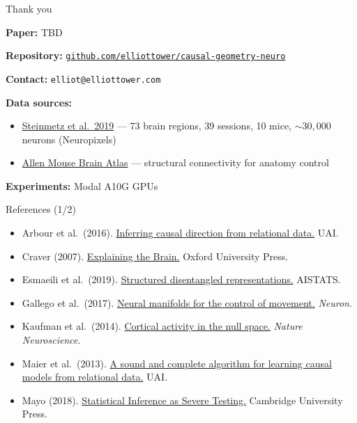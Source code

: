 \documentclass[aspectratio=169,11pt]{beamer}
\begin{document}
\begin{frame}{Thank you}

\textbf{Paper:} TBD

\vspace{0.3em}
\textbf{Repository:} \href{https://github.com/elliottower/causal-geometry-neuro}{\texttt{github.com/elliottower/causal-geometry-neuro}}

\vspace{0.3em}
\textbf{Contact:} \texttt{elliot@elliottower.com}

\vspace{0.3em}
{\small
\textbf{Data sources:}
\begin{itemize}\setlength\itemsep{0pt}
  \item \href{https://doi.org/10.1038/s41586-019-1787-x}{Steinmetz et al.\ 2019} --- 73 brain regions, 39 sessions, 10 mice, ${\sim}30{,}000$ neurons (Neuropixels)
  \item \href{https://connectivity.brain-map.org/}{Allen Mouse Brain Atlas} --- structural connectivity for anatomy control
\end{itemize}

\textbf{Experiments:} Modal A10G GPUs
}
\end{frame}

\begin{frame}{References (1/2)}
\vspace{-0.3em}
{\scriptsize
\begin{itemize}\setlength\itemsep{0pt}
  \item Arbour et al.\ (2016). \href{https://www.auai.org/uai2016/proceedings/papers/217.pdf}{Inferring causal direction from relational data.} UAI.
  \item Craver (2007). \href{https://doi.org/10.1093/acprof:oso/9780199299317.001.0001}{Explaining the Brain.} Oxford University Press.
  \item Esmaeili et al.\ (2019). \href{https://proceedings.mlr.press/v89/esmaeili19a}{Structured disentangled representations.} AISTATS.
  \item Gallego et al.\ (2017). \href{https://doi.org/10.1038/nn.4510}{Neural manifolds for the control of movement.} \textit{Neuron}.
  \item Kaufman et al.\ (2014). \href{https://doi.org/10.1038/nn.3643}{Cortical activity in the null space.} \textit{Nature Neuroscience}.
  \item Maier et al.\ (2013). \href{https://arxiv.org/abs/1309.6843}{A sound and complete algorithm for learning causal models from relational data.} UAI.
  \item Mayo (2018). \href{https://doi.org/10.1017/9781107286184}{Statistical Inference as Severe Testing.} Cambridge University Press.
\end{itemize}
}
\end{frame}
\end{document}
